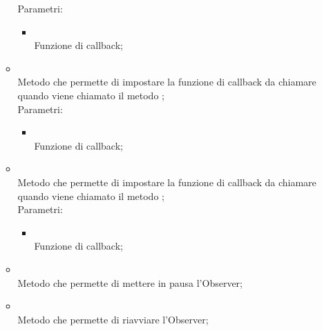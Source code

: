 \begin{itemize}
\begin{itemize}
		Parametri:
		\begin{itemize}
			\item {} \\
			Funzione di callback;
		\end{itemize}
		\item[]  \\
		Metodo che permette di impostare la funzione di callback da chiamare quando viene chiamato il metodo ;\\
		Parametri:
		\begin{itemize}
			\item {} \\
			Funzione di callback;
		\end{itemize}
		\item[]  \\
		Metodo che permette di impostare la funzione di callback da chiamare quando viene chiamato il metodo ;\\
		Parametri:
		\begin{itemize}
			\item {} \\
			Funzione di callback;
		\end{itemize}
		\item[]  \\
		Metodo che permette di mettere in pausa l'Observer;\\
		\item[]  \\
		Metodo che permette di riavviare l'Observer;\\
	\end{itemize}
\end{itemize}
\FloatBarrier

